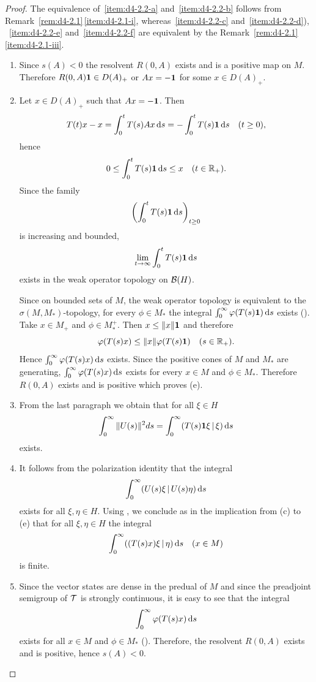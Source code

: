 \begin{proof}
The equivalence of~\ref{item:d4-2.2-a} and~\ref{item:d4-2.2-b} follows from Remark~\ref{rem:d4-2.1}\,\ref{item:d4-2.1-i}, whereas~\ref{item:d4-2.2-c} and~\ref{item:d4-2.2-d}), \resp~\ref{item:d4-2.2-e} and~\ref{item:d4-2.2-f} are equivalent by the Remark~\ref{rem:d4-2.1}\,\ref{item:d4-2.1-iii}.
\begin{enumerate}[wide, labelindent=.25em]

\item[(a) $\implies$ (c):] Since $s(A) < 0$ the resolvent $R(0,A)$ exists and is a positive map on $M$.
Therefore $R(0,A)\mathbf{1} \in D(A)_{+}$ or $Ax = -\mathbf{1}$ for some $x \in D(A)_{+}$.


\item[(c) $\implies$ (e):] Let $x \in D(A)_{+}$ such that $Ax = -\mathbf{1}$.
Then
\[
T(t)x - x = \int_{0}^{t} T(s)Ax \ds = -\int_{0}^{t} T(s) \1 \ds \quad (t \geq 0),
\]
hence
\[
0 \leq \int_{0}^{t} T(s) \1 \ds \leq x \quad (t \in \R_{+}).
\]
Since the family 
%
\[
	\mleft( \int_{0}^{t} T(s)\1 \ds \mright)_{t \geq 0}
\]
%
is increasing and bounded, 
%
\[
	\lim_{t \to \infty} \int_{0}^{t} T(s) \mathbf{1} \mathop{}\!\mathrm{d}{s}
\]
%
exists in the weak operator topology on $\mathcal{B}(H)$.

Since on bounded sets of\/ $M$, the weak operator topology is equivalent to the $\sigma(M,M_{*})$-topology, for every $\phi \in M_{*}$ the integral $ \int_{0}^{\infty}\phi(T(s) \1) \ds $ exists (\textcite[1.15.2.]{sakai:1971}).
Take $x \in M_{+}$ and $\phi \in M_{*}^{+}$.
Then $x \leq \|x\| \1$ and therefore
\[
	\phi(T(s)x) \leq \|x\|\phi(T(s) \1) \quad (s \in \R_{+}).
\]
Hence $\int_{0}^{\infty} \phi(T(s)x) \ds$ exists.
Since the positive cones of\/ $M$ and $M_{*}$ are generating, $\int_{0}^{\infty}\phi(T(s)x) \ds$ exists for every $x \in M$ and $\phi \in M_{*}$.
Therefore $R(0,A)$ exists and is positive which proves (e).

\item[(c) $\implies$ (g):] From the last paragraph we obtain that for all $\xi \in H$
\[
\int_{0}^{\infty}\|U(s)\|^2ds = \int_{0}^{\infty}(T(s)\mathbf{1}\xi \,|\, \xi) \mathop{}\!\mathrm{d}{s}
\]
exists.

\item[(g) $\implies$ (h):] It follows from the polarization identity that the integral
\[
\int_{0}^{\infty}(U(s)\xi \,|\, U(s)\eta) \mathop{}\!\mathrm{d}{s}
\]
exists for all $\xi,\eta \in H$.
Using \textcite[Theorem III.4.2 and Theorem II.2.6]{takesaki:1979}, we conclude as in the implication from (c) to (e) that for all $\xi,\eta \in H$ the integral
\[
\int_{0}^{\infty}((T(s)x)\xi \,|\, \eta) \mathop{}\!\mathrm{d}{s} \quad (x \in M)
\]
is finite.

\item[(g) $\implies$ (a):] Since the vector states are dense in the predual of\/ $M$ and since the preadjoint semigroup of\/ $\mathcal{T}$ is strongly continuous, it is easy to see that the integral
\[
\int_{0}^{\infty} \phi(T(s)x) \ds
\]
exists for all $x \in M$ and $\phi \in M_{*}$ (\textcite[Theorem II.2.6]{takesaki:1979}).
Therefore, the resolvent $R(0,A)$ exists and is positive, hence $s(A) < 0$.
\end{enumerate}
\end{proof}
